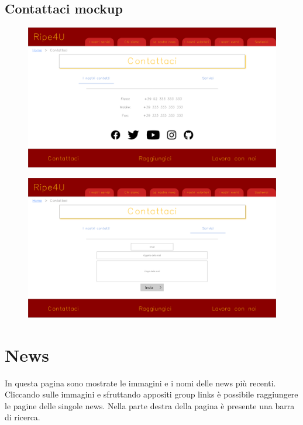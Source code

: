         \subsection{Contattaci mockup}
        \begin{figure}[H]
            \centering
            \includegraphics[scale=0.18]{resources/images/contattaci1-mockup.png}
        \end{figure}
        \begin{figure}[H]
            \centering
            \includegraphics[scale=0.18]{resources/images/contattaci2-mockup.png}
        \end{figure}
    
    \newpage    
    \section{News}
    In questa pagina sono mostrate le immagini e i nomi delle news più recenti.
    Cliccando sulle immagini e sfruttando appositi group links è possibile
    raggiungere le pagine delle singole news. Nella parte destra della pagina è
    presente una barra di ricerca.

